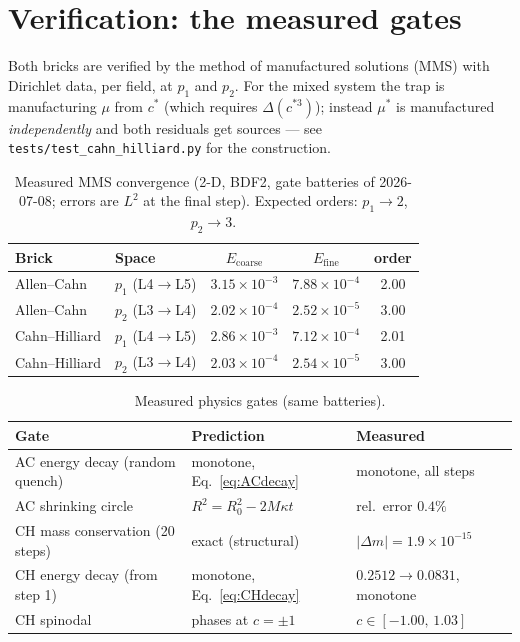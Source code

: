 \documentclass[11pt]{article}
\begin{document}
\section{Verification: the measured gates}

Both bricks are verified by the method of manufactured solutions (MMS)
with Dirichlet data, per field, at $p_1$ and $p_2$. For the mixed
system the trap is manufacturing $\mu$ from $c^*$ (which requires
$\Delta(c^{*3})$); instead $\mu^*$ is manufactured \emph{independently}
and both residuals get sources --- see
\texttt{tests/test\_cahn\_hilliard.py} for the construction.

\begin{table}[h]
\centering
\caption{Measured MMS convergence (2-D, BDF2, gate batteries of
2026-07-08; errors are $L^2$ at the final step). Expected orders:
$p_1 \to 2$, $p_2 \to 3$.}
\begin{tabular}{llccc}
\toprule
Brick & Space & $E_{\text{coarse}}$ & $E_{\text{fine}}$ & order \\
\midrule
Allen--Cahn    & $p_1$ (L4$\to$L5) & $3.15\times10^{-3}$ & $7.88\times10^{-4}$ & 2.00 \\
Allen--Cahn    & $p_2$ (L3$\to$L4) & $2.02\times10^{-4}$ & $2.52\times10^{-5}$ & 3.00 \\
Cahn--Hilliard & $p_1$ (L4$\to$L5) & $2.86\times10^{-3}$ & $7.12\times10^{-4}$ & 2.01 \\
Cahn--Hilliard & $p_2$ (L3$\to$L4) & $2.03\times10^{-4}$ & $2.54\times10^{-5}$ & 3.00 \\
\bottomrule
\end{tabular}
\label{tab:mms}
\end{table}

\begin{table}[h]
\centering
\caption{Measured physics gates (same batteries).}
\begin{tabular}{lll}
\toprule
Gate & Prediction & Measured \\
\midrule
AC energy decay (random quench) & monotone, Eq.~\eqref{eq:ACdecay} & monotone, all steps \\
AC shrinking circle & $R^2 = R_0^2 - 2M\kappa t$ & rel.\ error $0.4\%$ \\
CH mass conservation (20 steps) & exact (structural) & $\lvert\Delta m\rvert = 1.9\times10^{-15}$ \\
CH energy decay (from step 1) & monotone, Eq.~\eqref{eq:CHdecay} & $0.2512 \to 0.0831$, monotone \\
CH spinodal & phases at $c=\pm1$ & $c \in [-1.00,\, 1.03]$ \\
\bottomrule
\end{tabular}
\label{tab:gates}
\end{table}
\end{document}
